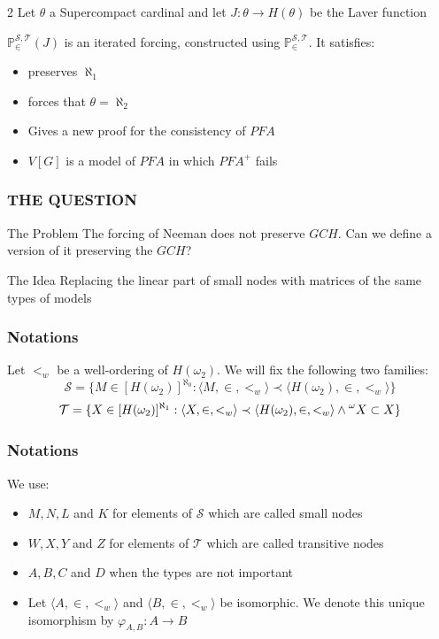 \documentclass[10pt]{beamer}
\newcommand{\ms}{\mathcal{S}}
\newcommand{\mt}{\mathcal{T}}
\begin{document}
\begin{frame}
\begin{block}{2}
Let $\theta$ a Supercompact cardinal and let $J: \theta \longrightarrow H(\theta)$ be the Laver function

$\mathbb{P}_{\in}^{\mathcal{S}, \mathcal{T}}(J)$ is an iterated forcing, constructed using $\mathbb{P}_{\in}^{\mathcal{S}, \mathcal{T}}$. It satisfies:
\begin{itemize}
\item[$(1)$] preserves $\aleph_1$
\item[$(2)$] forces that $\theta = \aleph_2$
\item[$(3)$] Gives a new proof for the consistency of $PFA$
\item[$(4)$] $V[G]$ is a model of $PFA$ in which $PFA^+$ fails
\end{itemize}
\end{block}
\end{frame}
\begin{frame}
\frametitle{THE QUESTION}
\begin{block}{The Problem}
The forcing of Neeman does not preserve $GCH$. Can we define a version of it preserving the $GCH$?
\end{block}

\begin{block}{The Idea}
Replacing the linear part of small nodes with matrices of the same types of models
\end{block}
\end{frame}
\begin{frame}
\frametitle{Notations}
Let $<_w$ be a well-ordering of $H(\omega_2)$. We will fix the following two families:
$$\ms=\{ M \in [ H(\omega_2)]^{\aleph_0}: \langle M, \in, <_w \rangle \prec \langle  H(\omega_2), \in, <_w \rangle \}$$
$$\mt=\{ X \in [ H(\omega_2)]^{\aleph_1}: \langle X, \in, <_w \rangle \prec \langle  H(\omega_2), \in, <_w \rangle \land \prescript{\omega}{}{X} \subset X \}$$
\end{frame}
\begin{frame}
\frametitle{Notations}
We use:
\begin{itemize}
\item
$M, N, L$ and $K$ for elements of $\ms$ which are called small nodes
\item $W,X, Y$ and $Z$ for elements of $\mt$ which are called transitive nodes
\item$A, B, C$ and $D$  when the types are not important
\item Let $\langle A, \in, <_w \rangle$ and $\langle B, \in, <_w \rangle$ be isomorphic. We denote this unique isomorphism by $\varphi_{A,B}:A \longrightarrow B$
\end{itemize}
\end{frame}
\end{document}
